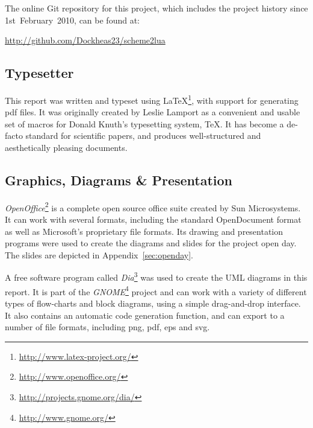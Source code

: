 The online Git repository for this project, which includes the project history
since 1st~February~2010, can be found at:
\begin{framed}
\centering
\url{http://github.com/Dockheas23/scheme2lua}
\end{framed}

\subsection{Typesetter}

This report was written and typeset using
\LaTeX\footnote{\url{http://www.latex-project.org/}}, with support for
generating pdf files. It was originally created by Leslie Lamport as a
convenient and usable set of macros for Donald Knuth's typesetting system, \TeX.
It has become a de-facto standard for scientific papers, and produces
well-structured and aesthetically pleasing documents.

\subsection{Graphics, Diagrams \& Presentation}

\emph{OpenOffice}\footnote{\url{http://www.openoffice.org/}} is a complete open
source office suite created by Sun Microsystems.  It can work with several
formats, including the standard OpenDocument format as well as Microsoft's
proprietary file formats. Its drawing and presentation programs were used to
create the diagrams and slides for the project open day. The slides are depicted
in Appendix~\ref{sec:openday}.

A free software program called
\emph{Dia}\footnote{\url{http://projects.gnome.org/dia/}} was used to create the
UML diagrams in this report. It is part of the
\emph{GNOME}\footnote{\url{http://www.gnome.org/}} project and can work with a
variety of different types of flow-charts and block diagrams, using a simple
drag-and-drop interface. It also contains an automatic code generation function,
and can export to a number of file formats, including png, pdf, eps and svg.

